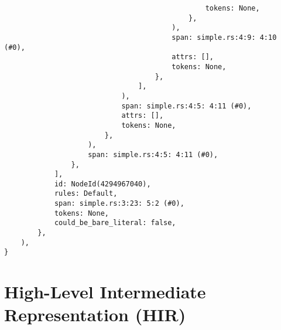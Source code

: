 \documentclass[
  11pt,
  twoside,symmetric]{report}
\begin{document}
\begin{verbatim}
                                                tokens: None,
                                            },
                                        ),
                                        span: simple.rs:4:9: 4:10 (#0),
                                        attrs: [],
                                        tokens: None,
                                    },
                                ],
                            ),
                            span: simple.rs:4:5: 4:11 (#0),
                            attrs: [],
                            tokens: None,
                        },
                    ),
                    span: simple.rs:4:5: 4:11 (#0),
                },
            ],
            id: NodeId(4294967040),
            rules: Default,
            span: simple.rs:3:23: 5:2 (#0),
            tokens: None,
            could_be_bare_literal: false,
        },
    ),
}
\end{verbatim}

\normalsize

\section{High-Level Intermediate Representation
(HIR)}\label{sec:high-level-intermediate-representation-hir}

\small
\end{document}
